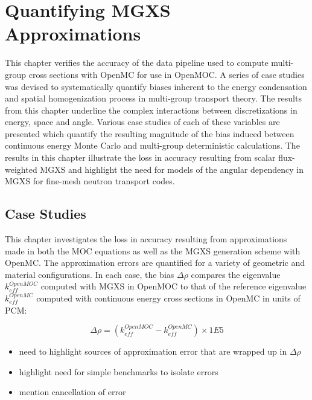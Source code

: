 \chapter{Quantifying MGXS Approximations}
\label{chap:biases}

This chapter verifies the accuracy of the data pipeline used to compute multi-group cross sections with OpenMC for use in OpenMOC. A series of case studies was devised to systematically quantify biases inherent to the energy condensation and spatial homogenization process in multi-group transport theory. The results from this chapter underline the complex interactions between discretizations in energy, space and angle. Various case studies of each of these variables are presented which quantify the resulting magnitude of the bias induced between continuous energy Monte Carlo and multi-group deterministic calculations. The results in this chapter illustrate the loss in accuracy resulting from scalar flux-weighted \ac{MGXS} and highlight the need for models of the angular dependency in \ac{MGXS} for fine-mesh neutron transport codes.


\section{Case Studies}
\label{sec:chap4-case-studies}

This chapter investigates the loss in accuracy resulting from approximations made in both the \ac{MOC} equations as well as the \ac{MGXS} generation scheme with OpenMC. The approximation errors are quantified for a variety of geometric and material configurations. In each case, the bias $\Delta\rho$ compares the eigenvalue $k_{eff}^{OpenMOC}$ computed with \ac{MGXS} in OpenMOC to that of the reference eigenvalue $k_{eff}^{OpenMC}$ computed with continuous energy cross sections in OpenMC in units of \ac{PCM}:

\begin{equation}
\label{eqn:chap4-delta-rho}
\Delta\rho = \left(k_{eff}^{OpenMOC} - k_{eff}^{OpenMC}\right) \times 1E5
\end{equation}

\begin{itemize}[noitemsep]
  \item need to highlight sources of approximation error that are wrapped up in $\Delta\rho$
  \item highlight need for simple benchmarks to isolate errors
  \item mention cancellation of error
\end{itemize}


